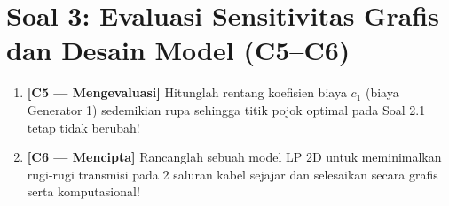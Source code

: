 \documentclass[11pt,a4paper]{article}
\begin{document}
\section*{Soal 3: Evaluasi Sensitivitas Grafis dan Desain Model (C5--C6)}

\begin{enumerate}[label=\textbf{3.\arabic*}, leftmargin=*]
    \item \textbf{[C5 --- Mengevaluasi]} Hitunglah rentang koefisien biaya $c_1$ (biaya Generator 1) sedemikian rupa sehingga titik pojok optimal pada Soal 2.1 tetap tidak berubah!

    \item \textbf{[C6 --- Mencipta]} Rancanglah sebuah model LP 2D untuk meminimalkan rugi-rugi transmisi pada 2 saluran kabel sejajar dan selesaikan secara grafis serta komputasional!
\end{enumerate}
\end{document}
